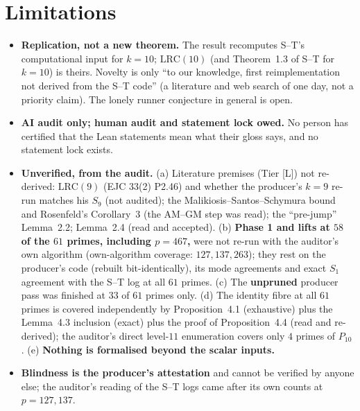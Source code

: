 \documentclass[10pt]{article}
\newcommand{\tier}[1]{\textsf{[#1]}}
\newcommand{\tL}{\tier{L}}
\newcommand{\LRC}[1]{\mathrm{LRC}(#1)}
\begin{document}
\section{Limitations}\label{sec:lim}
\begin{itemize}\itemsep=1pt
\item \textbf{Replication, not a new theorem.} The result recomputes S--T's computational input for $k=10$; $\LRC{10}$ (and Theorem~1.3 of S--T for $k=10$) is theirs. Novelty is only ``to our knowledge, first reimplementation not derived from the S--T code'' (a literature and web search of one day, not a priority claim). The lonely runner conjecture in general is open.
\item \textbf{AI audit only; human audit and statement lock owed.} No person has certified that the Lean statements mean what their gloss says, and no statement lock exists.
\item \textbf{Unverified, from the audit.} (a) Literature premises (Tier \tL{}) not re-derived: $\LRC9$ (EJC 33(2) P2.46) and whether the producer's $k=9$ re-run matches his $S_9$ (not audited); the Malikiosis--Santos--Schymura bound and Rosenfeld's Corollary~3 (the AM--GM step was read); the ``pre-jump'' Lemma~2.2; Lemma~2.4 (read and accepted). (b) \textbf{Phase 1 and lifts at $58$ of the $61$ primes, including $p=467$,} were not re-run with the auditor's own algorithm (own-algorithm coverage: $127,137,263$); they rest on the producer's code (rebuilt bit-identically), its mode agreements and exact $S_1$ agreement with the S--T log at all $61$ primes. (c) The \textbf{unpruned} producer pass was finished at $33$ of $61$ primes only. (d) The identity fibre at all $61$ primes is covered independently by Proposition~4.1 (exhaustive) plus the Lemma~4.3 inclusion (exact) plus the proof of Proposition~4.4 (read and re-derived); the auditor's direct level-$11$ enumeration covers only $4$ primes of $P_{10}$. (e) \textbf{Nothing is formalised beyond the scalar inputs.}
\item \textbf{Blindness is the producer's attestation} and cannot be verified by anyone else; the auditor's reading of the S--T logs came after its own counts at $p=127,137$.

\end{itemize}
\end{document}
